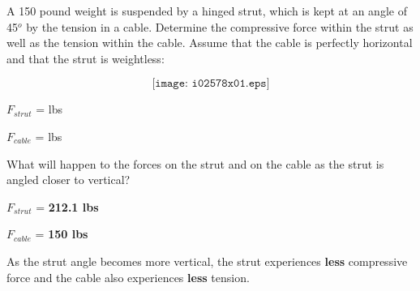 

A 150 pound weight is suspended by a hinged strut, which is kept at an angle of 45$^{o}$ by the tension in a cable.  Determine the compressive force within the strut as well as the tension within the cable.  Assume that the cable is perfectly horizontal and that the strut is weightless:

$$\texttt{[image: i02578x01.eps]}$$

$F_{strut}$ = \underbar{\hskip 50pt} lbs

\vskip 10pt

$F_{cable}$ = \underbar{\hskip 50pt} lbs

\vskip 10pt

What will happen to the forces on the strut and on the cable as the strut is angled closer to vertical?







$F_{strut}$ = {\bf 212.1 lbs}

\vskip 10pt

$F_{cable}$ = {\bf 150 lbs}

\vskip 10pt

As the strut angle becomes more vertical, the strut experiences {\bf less} compressive force and the cable also experiences {\bf less} tension.











